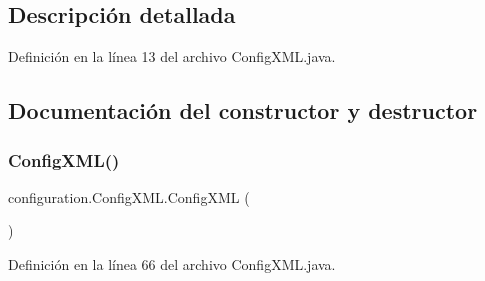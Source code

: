 \subsection{Descripción detallada}


Definición en la línea 13 del archivo Config\+X\+M\+L.\+java.



\subsection{Documentación del constructor y destructor}
\mbox{\label{classconfiguration_1_1_config_x_m_l_a0a848755f002c9c252612e188da0fee0}} 
\subsubsection{\texorpdfstring{ConfigXML()}{ConfigXML()}}
{\footnotesize\ttfamily configuration.\+Config\+X\+M\+L.\+Config\+X\+ML (\begin{DoxyParamCaption}{ }\end{DoxyParamCaption})\hspace{0.3cm}{\ttfamily [private]}}



Definición en la línea 66 del archivo Config\+X\+M\+L.\+java.



